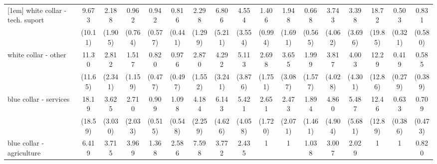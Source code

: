 {\begin{tabular}{l*{16}{c}}
[1em]
white collar - tech. suport&       9.673\sym{*}  &       2.188         &       0.962         &       0.942         &       0.816         &       2.298         &       6.806\sym{*}  &       4.554         &       1.406         &       1.948         &       0.668         &       3.743         &       3.398         &       18.72\sym{**} &       0.503         &       0.831         \\
                    &     (10.11)         &     (1.905)         &     (0.764)         &     (0.577)         &     (0.441)         &     (1.299)         &     (5.211)         &     (3.554)         &     (0.994)         &     (1.691)         &     (0.565)         &     (4.062)         &     (3.696)         &     (19.85)         &     (0.321)         &     (0.580)         \\
[1em]
white collar - other&       11.30\sym{*}  &       2.812         &       1.517         &       0.820         &       0.976         &       2.870         &       4.292         &       5.113\sym{*}  &       2.698         &       3.655         &       1.999         &       3.817         &       4.003         &       12.29\sym{*}  &       0.419         &       0.585         \\
                    &     (11.65)         &     (2.341)         &     (1.159)         &     (0.477)         &     (0.497)         &     (1.552)         &     (3.241)         &     (3.876)         &     (1.751)         &     (3.087)         &     (1.577)         &     (4.028)         &     (4.301)         &     (12.86)         &     (0.279)         &     (0.389)         \\
[1em]
blue collar - services&       18.19\sym{**} &       3.625         &       2.710         &       0.909         &       1.098         &       4.184\sym{**} &       6.143\sym{*}  &       5.421\sym{*}  &       2.651         &       2.473         &       1.894         &       4.860         &       5.487         &       12.46\sym{*}  &       0.633         &       0.709         \\
                    &     (18.59)         &     (3.030)         &     (2.033)         &     (0.515)         &     (0.548)         &     (2.259)         &     (4.626)         &     (4.058)         &     (1.720)         &     (2.071)         &     (1.461)         &     (4.904)         &     (5.681)         &     (12.89)         &     (0.386)         &     (0.473)         \\
[1em]
blue collar - agriculture&       6.419         &       3.715         &       3.969         &       1.368         &       2.586         &       7.598\sym{**} &       3.772         &       2.435         &           1         &           1         &       1.038         &       3.007         &       2.029         &           1         &           1         &       0.820         \\

\end{tabular}}

